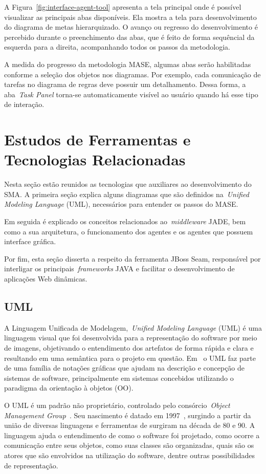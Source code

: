 A Figura~\ref{fig:interface-agent-tool} apresenta a tela principal onde é possível visualizar as principais abas disponíveis. Ela mostra a tela para desenvolvimento do diagrama de metas hierarquizado. O avanço ou regresso do desenvolvimento é percebido durante o preenchimento das abas, que é feito de forma sequêncial da esquerda para a direita, acompanhando todos os passos da metodologia.

A medida do progresso da metodologia MASE, algumas abas serão habilitadas conforme a seleção dos objetos nos diagramas. Por exemplo, cada comunicação de tarefas no diagrama de regras deve possuir um detalhamento. Dessa forma, a aba~\emph{Task Panel} torna-se automaticamente visível ao usuário quando há esse tipo de interação.

\section{Estudos de Ferramentas e Tecnologias Relacionadas}

Nesta seção estão reunidos as tecnologias que auxiliares ao desenvolvimento do SMA. A primeira seção explica alguns diagramas que são definidos na~\emph{Unified Modeling Language} (UML), necessários para entender os passos do MASE.
 
Em seguida é explicado os conceitos relacionados ao~\emph{middleware} JADE, bem como a sua arquitetura, o funcionamento dos agentes e os agentes que possuem interface gráfica.

Por fim, esta seção disserta a respeito da ferramenta JBoss Seam, responsável por interligar os principais~\emph{frameworks} JAVA e facilitar o desenvolvimento de aplicações Web dinâmicas.

\subsection{UML}

A Linguagem Unificada de Modelagem,~\emph{Unified Modeling Language} (UML) é uma linguagem visual que foi desenvolvida para a representação do software por meio de imagens, objetivando o entendimento dos artefatos de forma rápida e clara e resultando em uma semântica para o projeto em questão. Em~\cite{fowler04} o UML faz parte de uma família de notações gráficas que ajudam na descrição e concepção de sistemas de software, principalmente em sistemas concebidos utilizando o paradigma da orientação à objetos (OO).

O UML é um padrão não proprietário, controlado pelo consórcio~\emph{Object Management Group}~\cite{omg20}. Seu nascimento é datado em 1997~\cite{fowler04}, surgindo a partir da união de diversas linguagens e ferramentas de surgiram na década de 80 e 90.
A linguagem ajuda o entendimento de como o software foi projetado, como ocorre a comunicação entre seus objetos, como suas classes são organizadas, quais são os atores que são envolvidos na utilização do software, dentre outras possibilidades de representação.

